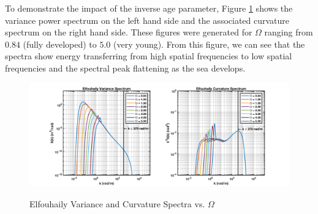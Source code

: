 To demonstrate the impact of the inverse age parameter, Figure \ref{os_fig:3a} shows the variance power spectrum on the left hand side and the associated curvature spectrum on the right hand side. These figures were generated for $\Omega$ ranging from $0.84$ (fully developed) to $5.0$ (very young). From this figure, we can see that the spectra show energy transferring from high spatial frequencies to low spatial frequencies and the spectral peak flattening as the sea develops.
\begin{figure}[H]
  \begin{center}
\includegraphics[width=6in]{../media/Ocean_Surface/elf_variance_curvature_spectrum_age.png}
  \end{center}
  \renewcommand{\baselinestretch}{1} \small\normalsize
  \begin{quote}
    \caption[Elfouhaily Variance and Curvature Spectra vs. $\Omega$]{Elfouhaily Variance and Curvature Spectra vs. $\Omega$ \label{os_fig:3a}}
  \end{quote}
\end{figure}
\renewcommand{\baselinestretch}{2} \small\normalsize

